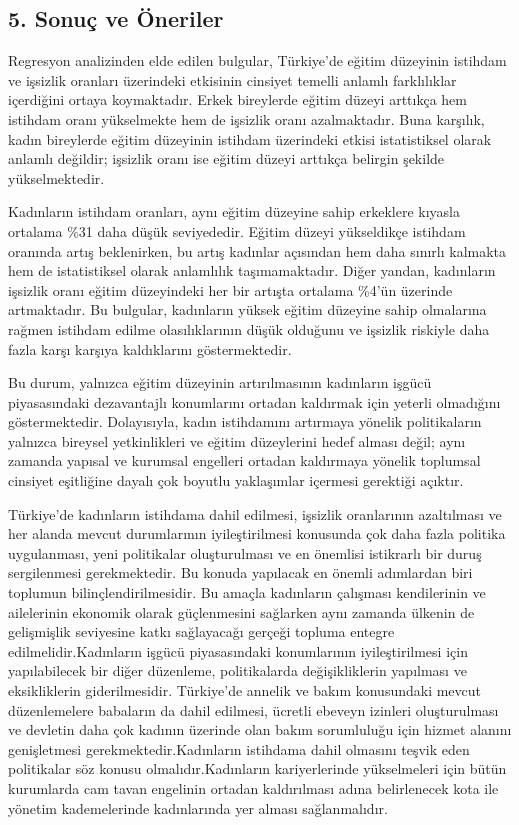 \documentclass[
  11pt,
  a4paper,
  DIV=11,
  numbers=noendperiod]{scrartcl}
\begin{document}
\subsection{5. Sonuç ve Öneriler}\label{sonuuxe7-ve-uxf6neriler}

Regresyon analizinden elde edilen bulgular, Türkiye'de eğitim düzeyinin
istihdam ve işsizlik oranları üzerindeki etkisinin cinsiyet temelli
anlamlı farklılıklar içerdiğini ortaya koymaktadır. Erkek bireylerde
eğitim düzeyi arttıkça hem istihdam oranı yükselmekte hem de işsizlik
oranı azalmaktadır. Buna karşılık, kadın bireylerde eğitim düzeyinin
istihdam üzerindeki etkisi istatistiksel olarak anlamlı değildir;
işsizlik oranı ise eğitim düzeyi arttıkça belirgin şekilde
yükselmektedir.

Kadınların istihdam oranları, aynı eğitim düzeyine sahip erkeklere
kıyasla ortalama \%31 daha düşük seviyededir. Eğitim düzeyi yükseldikçe
istihdam oranında artış beklenirken, bu artış kadınlar açısından hem
daha sınırlı kalmakta hem de istatistiksel olarak anlamlılık
taşımamaktadır. Diğer yandan, kadınların işsizlik oranı eğitim
düzeyindeki her bir artışta ortalama \%4'ün üzerinde artmaktadır. Bu
bulgular, kadınların yüksek eğitim düzeyine sahip olmalarına rağmen
istihdam edilme olasılıklarının düşük olduğunu ve işsizlik riskiyle daha
fazla karşı karşıya kaldıklarını göstermektedir.

Bu durum, yalnızca eğitim düzeyinin artırılmasının kadınların işgücü
piyasasındaki dezavantajlı konumlarını ortadan kaldırmak için yeterli
olmadığını göstermektedir. Dolayısıyla, kadın istihdamını artırmaya
yönelik politikaların yalnızca bireysel yetkinlikleri ve eğitim
düzeylerini hedef alması değil; aynı zamanda yapısal ve kurumsal
engelleri ortadan kaldırmaya yönelik toplumsal cinsiyet eşitliğine
dayalı çok boyutlu yaklaşımlar içermesi gerektiği açıktır.

Türkiye'de kadınların istihdama dahil edilmesi, işsizlik oranlarının
azaltılması ve her alanda mevcut durumlarının iyileştirilmesi konusunda
çok daha fazla politika uygulanması, yeni politikalar oluşturulması ve
en önemlisi istikrarlı bir duruş sergilenmesi gerekmektedir. Bu konuda
yapılacak en önemli adımlardan biri toplumun bilinçlendirilmesidir. Bu
amaçla kadınların çalışması kendilerinin ve ailelerinin ekonomik olarak
güçlenmesini sağlarken aynı zamanda ülkenin de gelişmişlik seviyesine
katkı sağlayacağı gerçeği topluma entegre edilmelidir.Kadınların işgücü
piyasasındaki konumlarının iyileştirilmesi için yapılabilecek bir diğer
düzenleme, politikalarda değişikliklerin yapılması ve eksikliklerin
giderilmesidir. Türkiye'de annelik ve bakım konusundaki mevcut
düzenlemelere babaların da dahil edilmesi, ücretli ebeveyn izinleri
oluşturulması ve devletin daha çok kadının üzerinde olan bakım
sorumluluğu için hizmet alanını genişletmesi gerekmektedir.Kadınların
istihdama dahil olmasını teşvik eden politikalar söz konusu
olmalıdır.Kadınların kariyerlerinde yükselmeleri için bütün kurumlarda
cam tavan engelinin ortadan kaldırılması adına belirlenecek kota ile
yönetim kademelerinde kadınlarında yer alması sağlanmalıdır.
\end{document}
